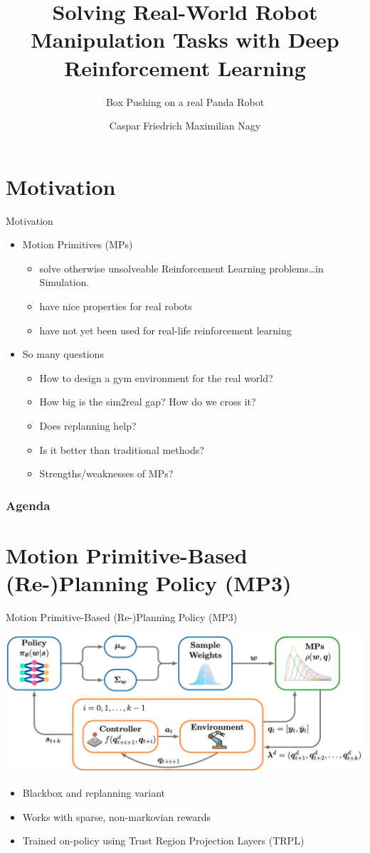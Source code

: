 \documentclass[16:9,en,navbarinfooter]{sdqbeamer}
\author{Caspar Friedrich Maximilian Nagy}
\title{Solving Real-World Robot Manipulation Tasks with Deep Reinforcement Learning}
\subtitle{Box Pushing on a real Panda Robot}
\begin{document}
\KITtitleframe{}


\section{Motivation}
\begin{frame}{Motivation}
\begin{itemize}
    \item Motion Primitives (MPs)
   \begin{itemize}
       \item solve otherwise unsolveable Reinforcement Learning problems\dots in Simulation.
       \item have nice properties for real robots
       \item have not yet been used for real-life reinforcement learning
   \end{itemize}
   \item So many questions
   \begin{itemize}
           \item How to design a gym environment for the real world?
           \item How big is the sim2real gap? How do we cross it?
           \item Does replanning help?
           \item Is it better than traditional methods?
           \item Strengths/weaknesses of MPs? 
   \end{itemize}
\end{itemize}

\end{frame}

\begin{frame}
\frametitle{Agenda}
    \vspace{.5cm}
\tableofcontents
\end{frame}

\section{Motion Primitive-Based (Re-)Planning Policy (MP3)}
\begin{frame}{Motion Primitive-Based (Re-)Planning Policy (MP3)}

\center 
    \vspace{1cm}
\includegraphics[width=.7\linewidth]{media/mp3.png}
\begin{itemize}
\item Blackbox and replanning variant
\item Works with sparse, non-markovian rewards
\item Trained on-policy using Trust Region Projection Layers (TRPL)
\end{itemize}
\end{frame}
\end{document}
